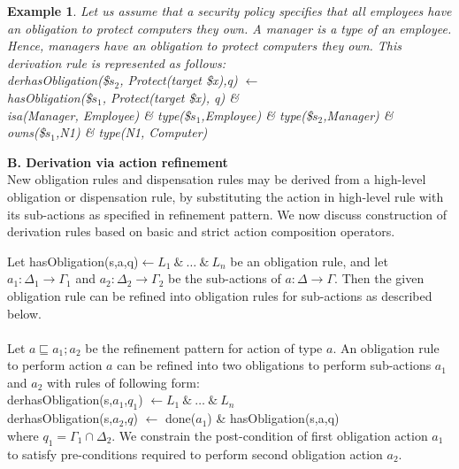 \documentclass[12pt,journal,letterpaper,onecolumn]{IEEEtran}
\newtheorem{example}{Example}[section]
\begin{document}
\begin{example}
Let us assume that a security policy specifies that all employees
have an obligation to protect computers they own. A manager is a
type of an employee. Hence, managers have an obligation to protect
computers they own. This derivation rule is represented as follows: \\

\noindent
{\ttfamily derhasObligation(\$$s_2$, Protect(target \$x),q) $\leftarrow$ \\
\indent hasObligation(\$$s_1$, Protect(target \$x), q) \&
\\ \indent isa(Manager, Employee) \& type(\$$s_1$,Employee) \&
type(\$$s_2$,Manager) \& \\
\indent owns(\$$s_1$,N1) \& type(N1, Computer)}
\end{example}

\noindent
{\bf B. Derivation via action refinement}\\
New obligation rules and dispensation rules may be derived from a
high-level obligation or dispensation rule, by substituting the
action in high-level rule with its sub-actions as specified in
refinement pattern. We now discuss construction of derivation rules
based on basic and strict action composition operators.

Let {\ttfamily hasObligation(s,a,q)}$\leftarrow L_1 ~\&~ \ldots ~\&~
L_n$ be an obligation rule, and let $a_1: \Delta_1 \rightarrow
\Gamma_1$ and $a_2: \Delta_2 \rightarrow \Gamma_2$ be the
sub-actions of $a: \Delta \rightarrow \Gamma$. Then the given
obligation rule can be
refined into obligation rules for sub-actions as described below. \\


\\ Let $a
\sqsubseteq a_1 ; a_2$ be the refinement pattern for action of type
$a$. An obligation rule to perform action $a$ can be refined into
two obligations to perform sub-actions $a_1$ and $a_2$ with rules
of following form:\\
\noindent
{\ttfamily derhasObligation(s,$a_1$,$q_1$)} $\leftarrow L_1 ~\&~ \ldots~\&~ L_n$ \\
{\ttfamily derhasObligation(s,$a_2$,$q$)} $\leftarrow$ {\ttfamily done($a_1$)  \& hasObligation(s,a,q)}\\
where $q_1 =  \Gamma_1 \cap \Delta_2$. We constrain the post-condition
of first obligation action $a_1$ to satisfy pre-conditions required
to perform second obligation action $a_2$.
\end{document}
